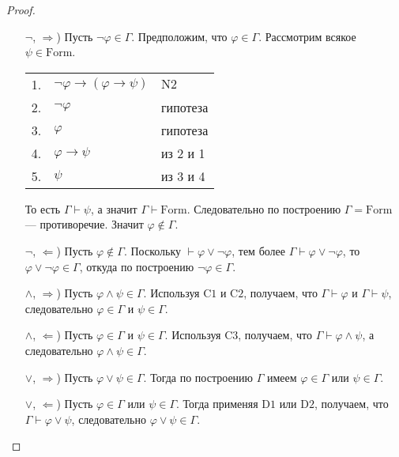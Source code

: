 \documentclass[12pt,a4paper]{article}
\newcommand{\Formul}{\ensuremath{\mathrm{Form}}\xspace}
\begin{document}
    \begin{proof}
        \begin{itemize}
            \item[$\neg$, $\Rightarrow$)] Пусть $\neg \varphi \in \Gamma$. Предположим, что $\varphi \in \Gamma$. Рассмотрим всякое $\psi \in \Formul$.
                \begin{center}
                    \begin{tabular}{rll}
                        1.& $\neg \varphi \rightarrow (\varphi \rightarrow \psi)$& $\mathrm{N2}$\\
                        2.& $\neg \varphi$& гипотеза\\
                        3.& $\varphi$& гипотеза\\
                        4.& $\varphi \rightarrow \psi$& из 2 и 1\\
                        5.& $\psi$& из 3 и 4\\
                    \end{tabular}
                \end{center}
                То есть $\Gamma \vdash \psi$, а значит $\Gamma \vdash \Formul$. Следовательно по построению $\Gamma = \Formul$ --- противоречие. Значит $\varphi \notin \Gamma$.

            \item[$\neg$, $\Leftarrow$)] Пусть $\varphi \notin \Gamma$. Поскольку $\vdash \varphi \vee \neg \varphi$, тем более $\Gamma \vdash \varphi \vee \neg \varphi$, то $\varphi \vee \neg \varphi \in \Gamma$, откуда по построению $\neg \varphi \in \Gamma$.

            \item[$\wedge$, $\Rightarrow$)] Пусть $\varphi \wedge \psi \in \Gamma$. Используя $\mathrm{C1}$ и $\mathrm{C2}$, получаем, что $\Gamma \vdash \varphi$ и $\Gamma \vdash \psi$, следовательно $\varphi \in \Gamma$ и $\psi \in \Gamma$.

            \item[$\wedge$, $\Leftarrow$)] Пусть $\varphi \in \Gamma$ и $\psi \in \Gamma$. Используя $\mathrm{C3}$, получаем, что $\Gamma \vdash \varphi \wedge \psi$, а следовательно $\varphi \wedge \psi \in \Gamma$.
            
            \item[$\vee$, $\Rightarrow$)] Пусть $\varphi \vee \psi \in \Gamma$. Тогда по построению $\Gamma$ имеем $\varphi \in \Gamma$ или $\psi \in \Gamma$.

            \item[$\vee$, $\Leftarrow$)] Пусть $\varphi \in \Gamma$ или $\psi \in \Gamma$. Тогда применяя $\mathrm{D1}$ или $\mathrm{D2}$, получаем, что $\Gamma \vdash \varphi \vee \psi$, следовательно $\varphi \vee \psi \in \Gamma$.


\end{itemize}
\end{proof}
\end{document}
